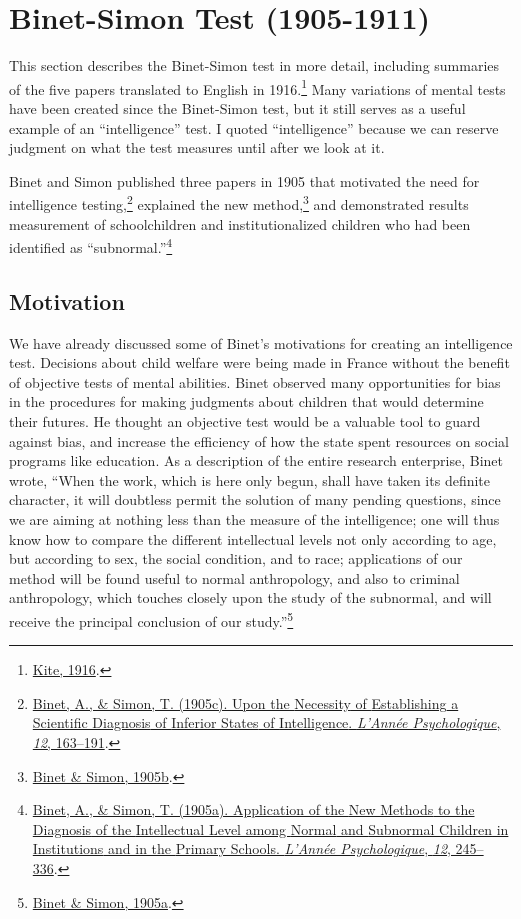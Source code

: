 \documentclass[
  oneside,
  12pt]{crumpbook}
\begin{document}
\hypertarget{binet-simon-test-1905-1911}{%
\section{Binet-Simon Test (1905-1911)}\label{binet-simon-test-1905-1911}}

This section describes the Binet-Simon test in more detail, including summaries of the five papers translated to English in 1916.\footnote{\protect\hyperlink{ref-kiteDevelopmentIntelligenceChildren1916}{Kite, 1916}.} Many variations of mental tests have been created since the Binet-Simon test, but it still serves as a useful example of an ``intelligence'' test. I quoted ``intelligence'' because we can reserve judgment on what the test measures until after we look at it.

Binet and Simon published three papers in 1905 that motivated the need for intelligence testing,\footnote{\protect\hyperlink{ref-binetNecessityEstablishingScientific1905}{Binet, A., \& Simon, T. (1905c). Upon the {Necessity} of {Establishing} a {Scientific Diagnosis} of {Inferior States} of {Intelligence}. \emph{L'Année Psychologique}, \emph{12}, 163--191}.} explained the new method,\footnote{\protect\hyperlink{ref-binetNewMethodsDiagnosis1905}{Binet \& Simon, 1905b}.} and demonstrated results measurement of schoolchildren and institutionalized children who had been identified as ``subnormal.''\footnote{\protect\hyperlink{ref-binetApplicationNewMethods1905}{Binet, A., \& Simon, T. (1905a). Application of the {New Methods} to the {Diagnosis} of the {Intellectual Level} among {Normal} and {Subnormal Children} in {Institutions} and in the {Primary Schools}. \emph{L'Année Psychologique}, \emph{12}, 245--336}.}

\hypertarget{motivation}{%
\subsection{Motivation}\label{motivation}}

We have already discussed some of Binet's motivations for creating an intelligence test. Decisions about child welfare were being made in France without the benefit of objective tests of mental abilities. Binet observed many opportunities for bias in the procedures for making judgments about children that would determine their futures. He thought an objective test would be a valuable tool to guard against bias, and increase the efficiency of how the state spent resources on social programs like education. As a description of the entire research enterprise, Binet wrote, ``When the work, which is here only begun, shall have taken its definite character, it will doubtless permit the solution of many pending questions, since we are aiming at nothing less than the measure of the intelligence; one will thus know how to compare the different intellectual levels not only according to age, but according to sex, the social condition, and to race; applications of our method will be found useful to normal anthropology, and also to criminal anthropology, which touches closely upon the study of the subnormal, and will receive the principal conclusion of our study.''\footnote{\protect\hyperlink{ref-binetApplicationNewMethods1905}{Binet \& Simon, 1905a}.}
\end{document}

